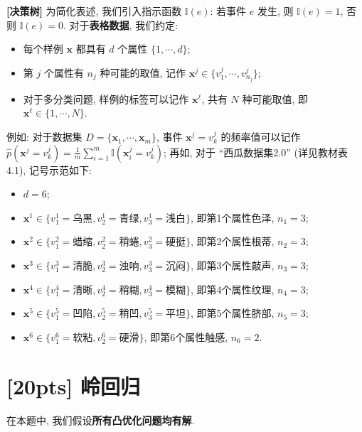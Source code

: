 \documentclass[a4paper]{article}
\numberwithin{equation}{section}
\theoremstyle{definition}
\def \x {\bm{x}}
\newcommand\sbr[1]{\left( #1 \right)}
\newcommand\indicator[1]{\mathbb{I}\sbr{#1}}
\begin{document}
\textbf{[决策树]} 为简化表述, 我们引入指示函数 $\indicator{e}$: 若事件 $e$ 发生, 则 $\indicator{e} = 1$, 否则 $\indicator{e} = 0$. 对于\textbf{表格数据}, 我们约定:

\begin{itemize}
	\setlength\itemsep{0em}
	\item 每个样例 $\x$ 都具有 $d$ 个属性 $\{1, \cdots, d\}$;
	\item 第 $j$ 个属性有 $n_j$ 种可能的取值, 记作 $\x^j \in \{v^j_1, \cdots, v^j_{n_j}\}$;
	\item 对于多分类问题, 样例的标签可以记作 $\x^\ell$, 共有 $N$ 种可能取值, 即 $\x^\ell \in \{1, \cdots, N\}$.
\end{itemize}

例如: 对于数据集 $D = \{\x_1, \cdots, \x_m\}$, 事件 $\x^j = v^j_k$ 的频率值可以记作 $\hat{p}(\x^j = v^j_k) = \frac{1}{m} \sum_{i=1}^{m} \indicator{\x_i^j = v^j_k}$; 再如, 对于 ``西瓜数据集2.0'' (详见教材表4.1), 记号示范如下:

\begin{itemize}
	\setlength\itemsep{0em}
	\item $d = 6$;
	\item $\x^1 \in \{v^1_1=\text{乌黑}, v^1_2=\text{青绿}, v^1_3=\text{浅白}\}$, 即第1个属性色泽, $n_1 = 3$;
	\item $\x^2 \in \{v^2_1=\text{蜡缩}, v^2_2=\text{稍蜷}, v^2_3=\text{硬挺}\}$, 即第2个属性根蒂, $n_2 = 3$;
	\item $\x^3 \in \{v^3_1=\text{清脆}, v^3_2=\text{浊响}, v^3_3=\text{沉闷}\}$, 即第3个属性敲声, $n_3 = 3$;
	\item $\x^4 \in \{v^4_1=\text{清晰}, v^4_2=\text{稍糊}, v^4_3=\text{模糊}\}$, 即第4个属性纹理, $n_4 = 3$;
	\item $\x^5 \in \{v^5_1=\text{凹陷}, v^5_2=\text{稍凹}, v^5_3=\text{平坦}\}$, 即第5个属性脐部, $n_5 = 3$;
	\item $\x^6 \in \{v^6_1=\text{软粘}, v^6_2=\text{硬滑}\}$, 即第6个属性触感, $n_6 = 2$.
\end{itemize}

\newpage

\section{[20pts] 岭回归}

在本题中, 我们假设\textbf{所有凸优化问题均有解}.
\end{document}

